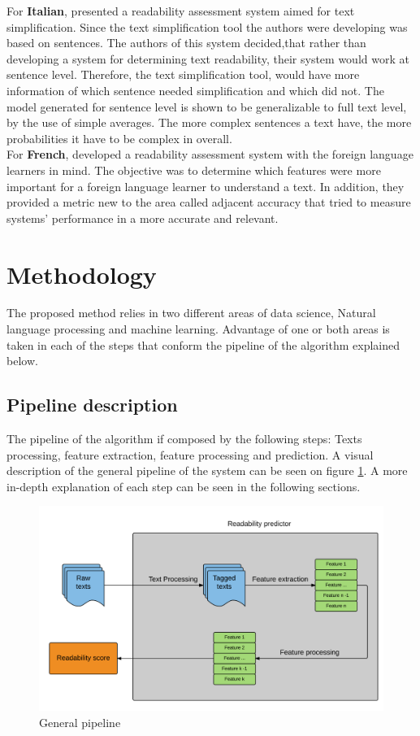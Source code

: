 \documentclass[12pt]{article}
\begin{document}
For \textbf{Italian}, \cite{dell2011read} presented a readability assessment system aimed for text simplification. Since the text simplification tool the authors were developing was based on sentences. The authors of this system decided,that rather than developing a system for determining text readability, their system would work at sentence level. Therefore, the text simplification tool, would have more information of which sentence needed simplification and which did not. The model generated for sentence level is shown to be generalizable to full text level, by the use of simple averages. The more complex sentences a text have, the more probabilities it have to be complex in overall.\\

For \textbf{French},\cite{franccois2012ai} developed a readability assessment system with the foreign language learners in mind. The objective was to determine which features were more important for a foreign language learner to understand a text. In addition, they provided a metric new to the area called adjacent accuracy that tried to measure systems' performance in a more accurate and relevant. \\



\section{Methodology}
The proposed method relies in two different areas of data science, Natural language processing and machine learning. Advantage of one or both areas is taken in each of the steps that conform the pipeline of the algorithm explained below.
\subsection{Pipeline description}
The pipeline of the algorithm if composed by the following steps: Texts processing, feature extraction, feature processing and prediction. A visual description of the general pipeline of the system can be seen on figure \ref{fig:pipeline}.  A more in-depth explanation of each step can be seen in the following sections.

\begin{figure}[h]
\includegraphics[width=\textwidth]{pipeline}
\caption{General pipeline}
\label{fig:pipeline}
\end{figure}
\end{document}
